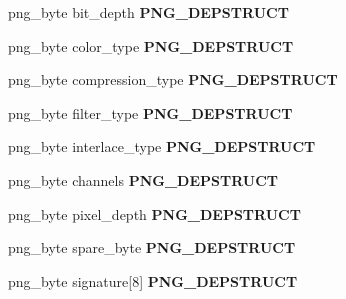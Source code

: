 \begin{DoxyCompactItemize}
\item 
png\+\_\+byte bit\+\_\+depth {\bfseries P\+N\+G\+\_\+\+D\+E\+P\+S\+T\+R\+U\+CT}\hypertarget{structpng__info__struct_ad2693c340c6b1c5132f99ed373661eb5}{}\label{structpng__info__struct_ad2693c340c6b1c5132f99ed373661eb5}

\item 
png\+\_\+byte color\+\_\+type {\bfseries P\+N\+G\+\_\+\+D\+E\+P\+S\+T\+R\+U\+CT}\hypertarget{structpng__info__struct_a2bf336786507e0dc8fe92b8f6d89eb0a}{}\label{structpng__info__struct_a2bf336786507e0dc8fe92b8f6d89eb0a}

\item 
png\+\_\+byte compression\+\_\+type {\bfseries P\+N\+G\+\_\+\+D\+E\+P\+S\+T\+R\+U\+CT}\hypertarget{structpng__info__struct_ac27c6ac9aaa7e13fc36703fd417dc38e}{}\label{structpng__info__struct_ac27c6ac9aaa7e13fc36703fd417dc38e}

\item 
png\+\_\+byte filter\+\_\+type {\bfseries P\+N\+G\+\_\+\+D\+E\+P\+S\+T\+R\+U\+CT}\hypertarget{structpng__info__struct_ae5d1ea545c5e7d57fdd0efbea4aa2a73}{}\label{structpng__info__struct_ae5d1ea545c5e7d57fdd0efbea4aa2a73}

\item 
png\+\_\+byte interlace\+\_\+type {\bfseries P\+N\+G\+\_\+\+D\+E\+P\+S\+T\+R\+U\+CT}\hypertarget{structpng__info__struct_afeca56088caac7983a0c84947f180804}{}\label{structpng__info__struct_afeca56088caac7983a0c84947f180804}

\item 
png\+\_\+byte channels {\bfseries P\+N\+G\+\_\+\+D\+E\+P\+S\+T\+R\+U\+CT}\hypertarget{structpng__info__struct_a7e0069f4f90c68689ae3f998acb456ec}{}\label{structpng__info__struct_a7e0069f4f90c68689ae3f998acb456ec}

\item 
png\+\_\+byte pixel\+\_\+depth {\bfseries P\+N\+G\+\_\+\+D\+E\+P\+S\+T\+R\+U\+CT}\hypertarget{structpng__info__struct_a3f7b09799a025d56f9054b762a03dbfe}{}\label{structpng__info__struct_a3f7b09799a025d56f9054b762a03dbfe}

\item 
png\+\_\+byte spare\+\_\+byte {\bfseries P\+N\+G\+\_\+\+D\+E\+P\+S\+T\+R\+U\+CT}\hypertarget{structpng__info__struct_a4fc501f431c375aab961c948a76fcb50}{}\label{structpng__info__struct_a4fc501f431c375aab961c948a76fcb50}

\item 
png\+\_\+byte signature\mbox{[}8\mbox{]} {\bfseries P\+N\+G\+\_\+\+D\+E\+P\+S\+T\+R\+U\+CT}\hypertarget{structpng__info__struct_a2edf6b88b6d0e4af4f4f175bf45fa5b9}{}\label{structpng__info__struct_a2edf6b88b6d0e4af4f4f175bf45fa5b9}


\end{DoxyCompactItemize}

